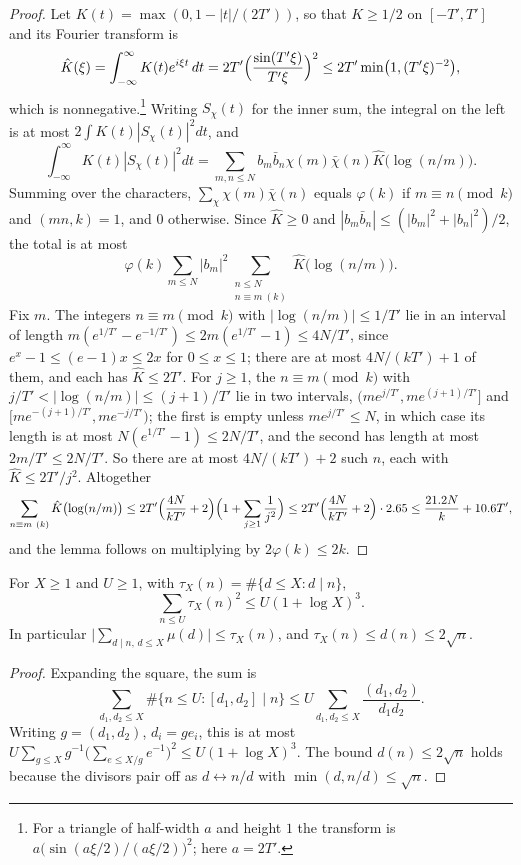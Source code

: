 \begin{proof}
Let $K(t)=\max(0,1-|t|/(2T'))$, so that $K\ge1/2$ on $[-T',T']$ and its Fourier transform is
\[
  \hat K(\xi)=\int_{-\infty}^\infty K(t)e^{i\xi t}\,dt=2T'\Bigl(\frac{\sin(T'\xi)}{T'\xi}\Bigr)^2\le2T'\min\bigl(1,(T'\xi)^{-2}\bigr),
\]
which is nonnegative.\footnote{For a triangle of half-width $a$ and height $1$ the transform is $a\bigl(\sin(a\xi/2)/(a\xi/2)\bigr)^2$; here $a=2T'$.} Writing $S_\chi(t)$ for the inner sum, the integral on the left is at most $2\int K(t)|S_\chi(t)|^2dt$, and
\[
  \int_{-\infty}^\infty K(t)|S_\chi(t)|^2dt=\sum_{m,n\le N}b_m\bar b_n\chi(m)\bar\chi(n)\hat K\bigl(\log(n/m)\bigr).
\]
Summing over the characters, $\sum_\chi\chi(m)\bar\chi(n)$ equals $\varphi(k)$ if $m\equiv n\pmod k$ and $(mn,k)=1$, and $0$ otherwise. Since $\hat K\ge0$ and $|b_m\bar b_n|\le(|b_m|^2+|b_n|^2)/2$, the total is at most
\[
  \varphi(k)\sum_{m\le N}|b_m|^2\sum_{\substack{n\le N\\ n\equiv m\ (k)}}\hat K\bigl(\log(n/m)\bigr).
\]
Fix $m$. The integers $n\equiv m\pmod k$ with $|\log(n/m)|\le1/T'$ lie in an interval of length $m(e^{1/T'}-e^{-1/T'})\le2m(e^{1/T'}-1)\le4N/T'$, since $e^x-1\le(e-1)x\le2x$ for $0\le x\le1$; there are at most $4N/(kT')+1$ of them, and each has $\hat K\le2T'$. For $j\ge1$, the $n\equiv m\pmod k$ with $j/T'<|\log(n/m)|\le(j+1)/T'$ lie in two intervals, $(me^{j/T'},me^{(j+1)/T'}]$ and $[me^{-(j+1)/T'},me^{-j/T'})$; the first is empty unless $me^{j/T'}\le N$, in which case its length is at most $N(e^{1/T'}-1)\le2N/T'$, and the second has length at most $2m/T'\le2N/T'$. So there are at most $4N/(kT')+2$ such $n$, each with $\hat K\le2T'/j^2$. Altogether
\[
  \sum_{n\equiv m\ (k)}\hat K\bigl(\log(n/m)\bigr)\le2T'\Bigl(\frac{4N}{kT'}+2\Bigr)\Bigl(1+\sum_{j\ge1}\frac1{j^2}\Bigr)\le2T'\Bigl(\frac{4N}{kT'}+2\Bigr)\cdot2.65\le\frac{21.2N}k+10.6T',
\]
and the lemma follows on multiplying by $2\varphi(k)\le2k$.
\end{proof}

\begin{lemma}\label{lem:divisorbound}
For $X\ge1$ and $U\ge1$, with $\tau_X(n)=\#\{d\le X:d\mid n\}$,
\[
  \sum_{n\le U}\tau_X(n)^2\le U(1+\log X)^3.
\]
In particular $\bigl|\sum_{d\mid n,\,d\le X}\mu(d)\bigr|\le\tau_X(n)$, and $\tau_X(n)\le d(n)\le2\sqrt n$.
\end{lemma}

\begin{proof}
Expanding the square, the sum is
\[
  \sum_{d_1,d_2\le X}\#\{n\le U:[d_1,d_2]\mid n\}\le U\sum_{d_1,d_2\le X}\frac{(d_1,d_2)}{d_1d_2}.
\]
Writing $g=(d_1,d_2)$, $d_i=ge_i$, this is at most $U\sum_{g\le X}g^{-1}\bigl(\sum_{e\le X/g}e^{-1}\bigr)^2\le U(1+\log X)^3$. The bound $d(n)\le2\sqrt n$ holds because the divisors pair off as $d\leftrightarrow n/d$ with $\min(d,n/d)\le\sqrt n$.
\end{proof}

